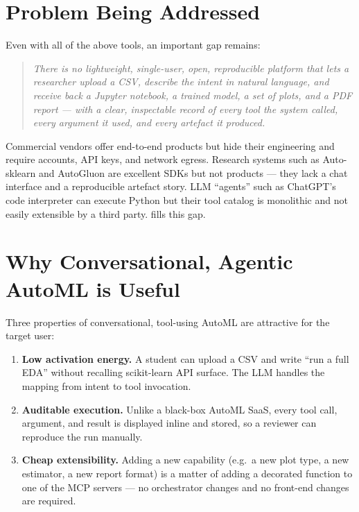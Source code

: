 \section{Problem Being Addressed}
\label{sec:problem-addressed}

Even with all of the above tools, an important gap remains:

\begin{quote}
\emph{There is no lightweight, single-user, open, reproducible platform
that lets a researcher upload a CSV, describe the intent in natural
language, and receive back a Jupyter notebook, a trained model, a set
of plots, and a PDF report --- with a clear, inspectable record of
every tool the system called, every argument it used, and every artefact
it produced.}
\end{quote}

Commercial vendors offer end-to-end products but hide their engineering
and require accounts, API keys, and network egress. Research systems
such as Auto-sklearn \citep{feurer2015autosklearn} and AutoGluon
\citep{erickson2020autogluon} are excellent SDKs but not products
--- they lack a chat interface and a reproducible artefact story.
LLM ``agents'' such as ChatGPT's code interpreter can execute Python
but their tool catalog is monolithic and not easily extensible by a
third party. \projname{} fills this gap.

\section{Why Conversational, Agentic AutoML is Useful}
\label{sec:why-agentic}

Three properties of conversational, tool-using AutoML are attractive
for the target user:

\begin{enumerate}[leftmargin=1.4em]
  \item \textbf{Low activation energy.} A student can upload a CSV and
        write ``run a full EDA'' without recalling scikit-learn API
        surface. The LLM handles the mapping from intent to tool
        invocation.
  \item \textbf{Auditable execution.} Unlike a black-box AutoML SaaS,
        every tool call, argument, and result is displayed inline and
        stored, so a reviewer can reproduce the run manually.
  \item \textbf{Cheap extensibility.} Adding a new capability (e.g.\ a
        new plot type, a new estimator, a new report format) is a
        matter of adding a decorated function to one of the MCP
        servers --- no orchestrator changes and no front-end changes
        are required.
\end{enumerate}

